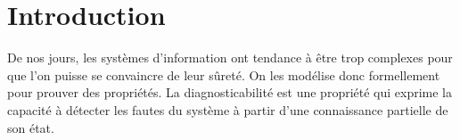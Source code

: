 \documentclass[conference]{IEEEtran}
\begin{document}
\begin{abstract}
La notion classique de diagnosticabilit\'e ne permet de mod\'eliser que des fautes permanentes, et le langage des fautes est donc suppos\'e extension-clos. Dans ce papier, nous rel\^achons cette hypoth\`ese afin de permettre la mod\'elisation de fautes r\'eparables. Pour ce faire, nous introduisons la T-diagnosticabilit\'e qui formalise le fait que toute faute est d\'etect\'ee en temps born\'e et avant d'\^etre r\'epar\'ee.

Nous montrons que la T-diagnosticabilit\'e \'etend bien la notion de diagnosticabilit\'e, c'est-\`a-dire que pour un syst\`eme dont les fautes sont permanentes, les notions de T-diagnosticabilit\'e et de diagnosticabilit\'e coincident.

Nous proposons un algorithme de d\'ecision PSPACE pour la T-diagnosticabilit\'e et une construction de T-diagnostiqueur.
\end{abstract}





%
\IEEEpeerreviewmaketitle



\section*{Introduction}
De nos jours, les syst\`emes d'information ont tendance \`a \^etre trop complexes pour que l'on puisse se convaincre de leur sûret\'e. On les mod\'elise donc formellement pour prouver des propriétés. La diagnosticabilit\'e est une propri\'et\'e qui exprime la capacit\'e \`a d\'etecter les fautes du syst\`eme \`a partir d'une connaissance partielle de son \'etat.
\end{document}
